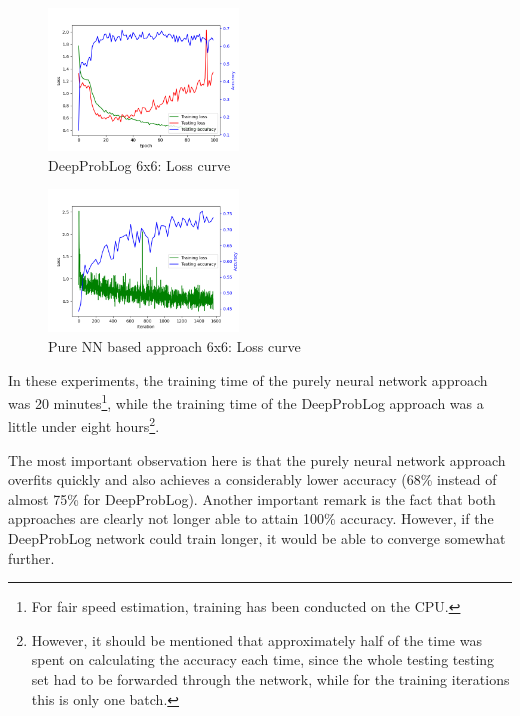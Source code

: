 \documentclass[english]{sobraep}
\begin{document}
\begin{figure}[htp]
    \begin{center}
    \includegraphics[width=0.45\textwidth]{loss_curve_deepproblog_6x6.png} 
    \captionsetup{justification=centering}
    \caption{DeepProbLog 6x6: Loss curve}
    \label{fig:loss_curve_deepproblog_6x6}
    \end{center}
\end{figure}

\begin{figure}[htp]
    \begin{center}
    \includegraphics[width=0.45\textwidth]{loss_curve_pure_NN_6x6.png} 
    \captionsetup{justification=centering}
    \caption{Pure NN based approach 6x6: Loss curve}
    \label{fig:loss_curve_pure_NN_6x6}
    \end{center}
\end{figure}

In these experiments, the training time of the purely neural network approach was 20 minutes\footnote{For fair speed estimation, training has been conducted on the CPU.}, while the training time of the DeepProbLog approach was a little under eight hours\footnote{However, it should be mentioned that approximately half of the time was spent on calculating the accuracy each time, since the whole testing testing set had to be forwarded through the network, while for the training iterations this is only one batch.}.

The most important observation here is that the purely neural network approach overfits quickly and also achieves a considerably lower accuracy (68\% instead of almost 75\% for DeepProbLog). Another important remark is the fact that both approaches are clearly not longer able to attain 100\% accuracy. However, if the DeepProbLog network could train longer, it would be able to converge somewhat further.
\end{document}
